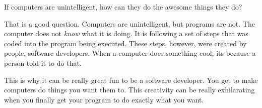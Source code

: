 If computers are unintelligent, how can they do the awesome things they do?

That is a good question. Computers are unintelligent, but programs are not. The computer does not \emph{know} what it is doing. It is following a set of steps that was coded into the program being executed. These steps, however, were created by people, software developers. When a computer does something cool, its because a person told it to do that.

This is why it can be really great fun to be a software developer. You get to make computers do things you want them to. This creativity can be really exhilarating when you finally get your program to do exactly what you want.





